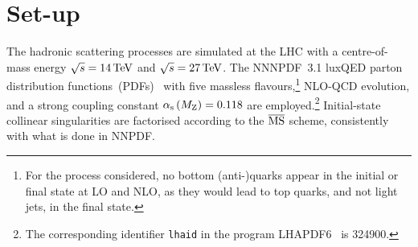 \documentclass[11pt,epsf]{article}
\begin{document}
\section{Set-up}

The hadronic scattering processes are simulated at the LHC with a centre-of-mass energy $\sqrt s = 14 \,\text{TeV}$ and $\sqrt s = 27 \,\text{TeV}$.
    The NNNPDF~3.1 luxQED parton distribution functions~(PDFs)~\cite{Bertone:2017bme} with five massless flavours,\footnote{For the process considered, no bottom (anti-)quarks appear in the initial or final state at LO and NLO, as they would lead to top quarks, and not light jets, in the final state.} 
    NLO-QCD evolution, and a strong coupling constant $\alpha_\text{s}\left( M_\text{Z} \right) = 0.118$ are employed.\footnote{The corresponding identifier {\tt lhaid} in the program LHAPDF6~\cite{Buckley:2014ana} is 324900.}
    Initial-state collinear singularities are factorised according to the ${\overline{\rm MS}}$ scheme, consistently with what is done in NNPDF.
\end{document}
